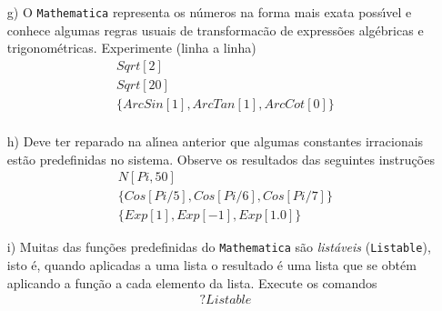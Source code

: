 \documentclass[11pt]{article}
\begin{document}
\begin{itemize}
Consulte o \texttt{Help} sobre os comandos  \texttt{Names} e \texttt{Length}. 



\item[g)]  O \texttt{Mathematica} representa os n\'umeros na forma mais exata poss\'\i vel e conhece algumas regras usuais de transforma{c}\~ao de express\~oes alg\'ebricas e trigonom\'etricas. Experimente (linha a linha)
 \[\begin{array}{l}
 Sqrt[2]\\
 Sqrt[20]\\
\{ArcSin[1],ArcTan[1],ArcCot[0]\}\\
 \end{array}
\]


\item[h)] Deve ter reparado na al\'\i nea anterior que algumas constantes irracionais est\~ao predefinidas no sistema. Observe os resultados das seguintes instru\c{c}\~oes
 \[\begin{array}{l}
 N[Pi,50]\\
\{Cos[Pi/5],Cos[Pi/6],Cos[Pi/7]\}
\\
\{Exp[1], Exp[-1], Exp[1.0]\}
 \end{array}
\]



\item[i)] Muitas das fun\c{c}\~oes predefinidas do \texttt{Mathematica} s\~ao \textsl{list\'aveis} (\texttt{Listable}), isto \'e, quando aplicadas a uma lista o resultado \'e uma lista que se obt\'em aplicando a fun\c{c}\~ao a cada elemento da lista. 
Execute os  comandos 
 \[\begin{array}{l}
 ?Listable 
 

\end{array}\]
\end{itemize}
\end{document}
